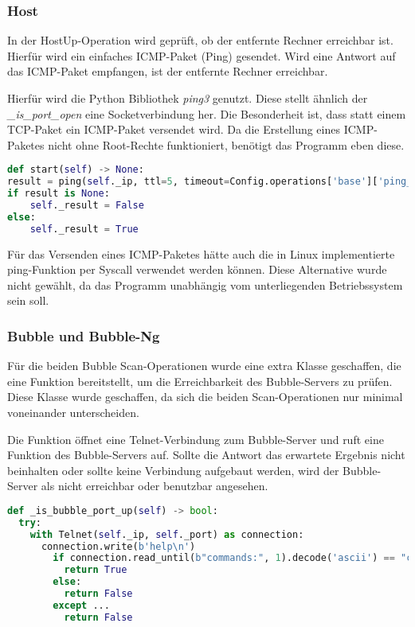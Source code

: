 \subsubsection{Host}
In der HostUp-Operation wird geprüft, ob der entfernte Rechner erreichbar ist. Hierfür wird ein einfaches ICMP-Paket (Ping) gesendet. Wird eine Antwort auf das ICMP-Paket empfangen, ist der entfernte Rechner erreichbar.

Hierfür wird die Python Bibliothek \textit{ping3} genutzt. Diese stellt ähnlich der \textit{\_is\_port\_open} eine Socketverbindung her. Die Besonderheit ist, dass statt einem TCP-Paket ein ICMP-Paket versendet wird. Da die Erstellung eines ICMP-Paketes nicht ohne Root-Rechte funktioniert, benötigt das Programm eben diese.

\begin{lstlisting}[language=Python, frame=single, caption={Big Brother HostUp Ping}, captionpos=b, label={lst:bigbrother-host-up}]
def start(self) -> None:
result = ping(self._ip, ttl=5, timeout=Config.operations['base']['ping_timeout'])
if result is None:
	self._result = False
else:
	self._result = True
\end{lstlisting}

Für das Versenden eines ICMP-Paketes hätte auch  die in Linux implementierte ping-Funktion per Syscall verwendet werden können. Diese Alternative wurde nicht gewählt, da das Programm unabhängig vom unterliegenden Betriebssystem sein soll.
 
\subsubsection{Bubble und Bubble-Ng}
Für die beiden Bubble Scan-Operationen wurde eine extra Klasse geschaffen, die eine Funktion bereitstellt, um die Erreichbarkeit des Bubble-Servers zu prüfen. Diese Klasse wurde geschaffen, da sich die beiden Scan-Operationen nur minimal voneinander unterscheiden.

Die Funktion öffnet eine Telnet-Verbindung zum Bubble-Server und ruft eine Funktion des Bubble-Servers auf. Sollte die Antwort das erwartete Ergebnis nicht beinhalten oder sollte keine Verbindung aufgebaut werden, wird der Bubble-Server  als nicht erreichbar oder benutzbar angesehen.

\begin{lstlisting}[language=Python, frame=single, caption={Big Brother Buble Port Prüfung}, captionpos=b, label={lst:bigbrother-bubble-up}]
def _is_bubble_port_up(self) -> bool:
  try:
    with Telnet(self._ip, self._port) as connection:
      connection.write(b'help\n')
        if connection.read_until(b"commands:", 1).decode('ascii') == "commands:":
          return True
        else:
          return False
        except ...
          return False
\end{lstlisting} 

